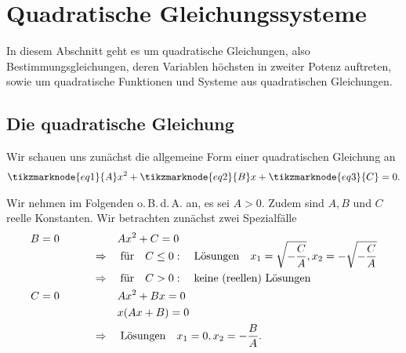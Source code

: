 
\thispagestyle{plain}
\section{Quadratische Gleichungssysteme}

In diesem Abschnitt geht es um quadratische Gleichungen, also Bestimmungsgleichungen, deren Variablen höchsten in zweiter Potenz auftreten, sowie um quadratische Funktionen und Systeme aus quadratischen Gleichungen.

\subsection{Die quadratische Gleichung}

Wir schauen uns zunächst die allgemeine Form einer quadratischen Gleichung an 
\begin{align}
    \tikzmarknode{eq1}{A} x^2 + \tikzmarknode{eq2}{B} x + \tikzmarknode{eq3}{C} =0.
\end{align}

\vspace{3mm}
Wir nehmen im Folgenden o.\,B.\,d.\,A. an, es sei $A >0$. Zudem sind $A,B$ und $C$ reelle Konstanten. Wir betrachten zunächst zwei Spezialfälle
\begin{alignat}{2}
    B &= 0 \qquad &&\qquad\; A x^2 + C = 0 \\[-3mm]
      &  &&\Rightarrow \qq{für} C \le 0: \qq{Lösungen} x_1 = \sqrt{-\frac{C}{A}}, x_2 = -\sqrt{-\frac{C}{A}} \notag \\
      & &&\Rightarrow \qq{für} C >0: \qq{keine (reellen) Lösungen} \notag\\
    C &= 0 \qquad &&\qquad\; A x^2 + Bx = 0 \\
      & && \qquad\; x(Ax + B) = 0 \notag \\
      & &&\Rightarrow \qq{Lösungen} x_1 = 0, x_2 = -\frac{B}{A}. \notag %
\end{alignat}

